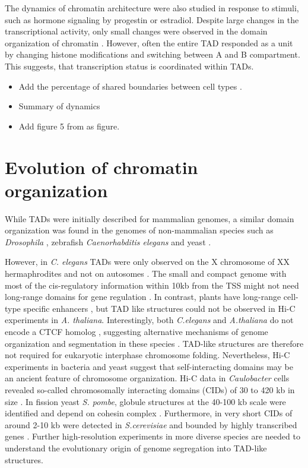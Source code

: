 \documentclass[a4paper,twoside=true,openright,parskip=full,chapterprefix=true,11pt,headings=normal,bibliography=totoc,listof=totoc,titlepage=on,captions=tableabove,draft=false]{scrreprt}
\providecommand{\tightlist}{%
  \setlength{\itemsep}{0pt}\setlength{\parskip}{0pt}}
\theoremstyle{definition}
\theoremstyle{definition}
\theoremstyle{definition}
\theoremstyle{remark}
\begin{document}
The dynamics of chromatin architecture were also studied in response to
stimuli, such as hormone signaling by progestin or estradiol. Despite
large changes in the transcriptional activity, only small changes were
observed in the domain organization of chromatin \citep{LeDily2014}.
However, often the entire TAD responded as a unit by changing histone
modifications and switching between A and B compartment. This suggests,
that transcription status is coordinated within TADs.

\begin{itemize}
\tightlist
\item
  Add the percentage of shared boundaries between cell types
  \citep{Dixon2012, Rao2014}.
\item
  Summary of dynamics
\item
  Add figure 5 from \citep{Andrey2017} as figure.
\end{itemize}

\hypertarget{evolution-of-chromatin-organization}{%
\section{Evolution of chromatin
organization}\label{evolution-of-chromatin-organization}}

While TADs were initially described for mammalian genomes, a similar
domain organization was found in the genomes of non-mammalian species
such as \emph{Drosophila} \citep{Sexton2012}, zebrafish
\citep{Gomez-Marin2015} \emph{Caenorhabditis elegans} \citep{Crane2015}
and yeast \citep{Hsieh2015, Mizuguchi2014}.

However, in \emph{C. elegans} TADs were only observed on the X
chromosome of XX hermaphrodites and not on autosomes \citep{Crane2015}.
The small and compact genome with most of the cis-regulatory information
within 10kb from the TSS might not need long-range domains for gene
regulation \citep{Long2016}. In contrast, plants have long-range
cell-type specific enhancers \citep{Zhu2015}, but TAD like structures
could not be observed in Hi-C experiments in \emph{A. thaliana}.
Interestingly, both \emph{C.elegans} and \emph{A.thaliana} do not encode
a CTCF homolog \citep{Heger2012}, suggesting alternative mechanisms of
genome organization and segmentation in these species \citep{Long2016}.
TAD-like structures are therefore not required for eukaryotic interphase
chromosome folding. Nevertheless, Hi-C experiments in bacteria and yeast
suggest that self-interacting domains may be an ancient feature of
chromosome organization. Hi-C data in \emph{Caulobacter} cells revealed
so-called chromosomally interacting domains (CIDs) of 30 to 420 kb in
size \citep{Le2013}. In fission yeast \emph{S. pombe}, globule
structures at the 40-100 kb scale were identified and depend on cohesin
complex \citep{Mizuguchi2014}. Furthermore, in very short CIDs of around
2-10 kb were detected in \emph{S.cerevisiae} and bounded by highly
transcribed genes \citep{Hsieh2015}. Further high-resolution experiments
in more diverse species are needed to understand the evolutionary origin
of genome segregation into TAD-like structures.
\end{document}
